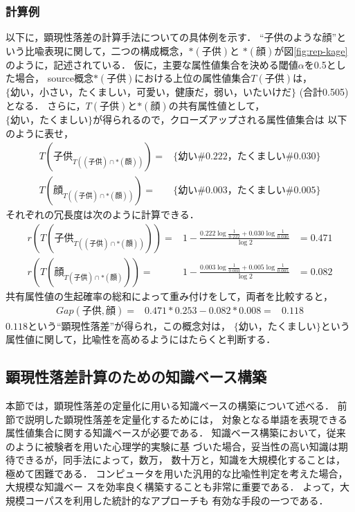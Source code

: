 \subsubsection*{計算例}
以下に，顕現性落差の計算手法についての具体例を示す．
``子供のような顔''という比喩表現に関して，二つの構成概念，${\ast}(子供)$と
${\ast}(顔)$が図\ref{fig:rep-kage}のように，記述されている．
仮に，主要な属性値集合を決める閾値$\alpha$を0.5とした場合，
source概念${\ast}(子供)$における上位の属性値集合$T(子供)$は，
$\{幼い，小さい，たくましい，可愛い，健康だ，弱い，いたいけだ\}$
(合計0.505)となる．
さらに，$T(子供)$と${\ast}(顔)$の共有属性値として，
$\{幼い，たくましい\}$が得られるので，クローズアップされる属性値集合は
以下のように表せ，
\begin{eqnarray}
\label{exp:int}
T(子供_{T((子供)\cap\ast(顔))}) = &\{幼い\#0.222，たくましい\#0.030\}\\%
\label{exp:int2}
T(顔_{T((子供)\cap\ast(顔))}) = &\{幼い\#0.003，たくましい\#0.005\}
\end{eqnarray}
それぞれの冗長度は次のように計算できる．
\begin{eqnarray}
\label{exp:int1-2}
r(T(子供_{T((子供)\cap\ast(顔))})) = &
1 - \frac{
	{0.222}\log{\frac{1}{0.222}}+{0.030}\log{\frac{1}{0.030}}
	}{\log{2}}
& = 0.471\\
\label{exp:int2-2}
r(T(顔_{T(子供)\cap\ast(顔)})) = &
1 - \frac{
	{0.003}\log{\frac{1}{0.003}}+{0.005}\log{\frac{1}{0.005}}
	}{\log{2}}
& = 0.082
\end{eqnarray}
共有属性値の生起確率の総和によって重み付けをして，両者を比較すると，
\begin{eqnarray}
Gap(子供,顔) = & 
0.471{\ast}0.253 - 0.082{\ast}0.008 = & 0.118
\end{eqnarray}
$0.118$という``顕現性落差''が得られ，この概念対は，
$\{幼い，たくましい\}$という
属性値に関して，比喩性を高めるようにはたらくと判断する．

\subsection{顕現性落差計算のための知識ベース構築}
本節では，顕現性落差の定量化に用いる知識ベースの構築について述べる．
前節で説明した顕現性落差を定量化するためには，
対象となる単語を表現できる属性値集合に関する知識ベースが必要である．
知識ベース構築において，従来のように被験者を用いた心理学的実験に基
づいた場合，妥当性の高い知識は期待できるが，同手法によって，数万，
数十万と，知識を大規模化することは，極めて困難である．
コンピュータを用いた汎用的な比喩性判定を考えた場合，大規模な知識ベー
スを効率良く構築することも非常に重要である．
よって，大規模コーパスを利用した統計的なアプローチも
有効な手段の一つである．

